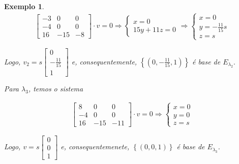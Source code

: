 \documentclass{article}
\newtheorem*{example}{Exemplo}
\begin{document}
\begin{example}
	\begin{align*}
	\begin{bmatrix}
	-3 & 0 & 0 \\
	-4 & 0 & 0 \\
	16 & -15 & -8
	\end{bmatrix}\cdot v = 0 \Rightarrow \begin{cases}
	x = 0 \\
	15y + 11z = 0
	\end{cases} \Rightarrow \begin{cases}
	x = 0 \\
	y = \displaystyle{-\frac{11}{15}}s\\
	z = s
	\end{cases}
	\end{align*}
	
	\par\vspace{0.3cm} Logo, $v_2 = s\begin{bmatrix}
	0\\
	\displaystyle{-\frac{11}{15}}\\
	1
	\end{bmatrix}$ e, consequentemente, $\left\{ \left(  0, \displaystyle{-\frac{11}{15}}, 1  \right)  \right\}$ é base de $E_{\lambda_2}.$	
	
	\par\vspace{0.3cm} Para $\lambda_3$, temos o sistema 
	
	\begin{align*}
	\begin{bmatrix}
	8 & 0 & 0 \\
	-4 & 0 & 0 \\
	16 & -15 & -11
	\end{bmatrix}\cdot v = 0 \Rightarrow \begin{cases}
	x = 0 \\
	y = 0\\
	z = s
	\end{cases}
	\end{align*}
	
	\par\vspace{0.3cm} Logo, $v = s\begin{bmatrix}
	0\\
	0\\
	1
	\end{bmatrix}$ e, consequentemenete, $\left\{ (0,0,1) \right\}$ é base de $E_{\lambda_3}$.
	
\end{example}
\end{document}
